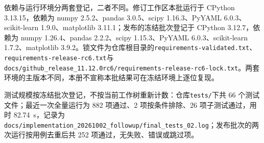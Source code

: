 \documentclass[12pt,a4paper]{article}
\begin{document}
依赖与运行环境分两套登记，二者不同。修订工作区本批运行于 CPython 3.13.15，依赖为 numpy 2.5.2、pandas 3.0.5、scipy 1.16.3、PyYAML 6.0.3、scikit-learn 1.9.0、matplotlib 3.11.1；发布的冻结批次登记于 CPython 3.12.7，依赖为 numpy 1.26.4、pandas 2.2.2、scipy 1.15.3、PyYAML 6.0.3、scikit-learn 1.7.2、matplotlib 3.9.2。锁文件为仓库根目录的\texttt{requirements-validated.txt}、\texttt{requirements-release-rc6.txt}与\texttt{docs/github\_release\_11.12.0rc6/requirements-release-rc6-lock.txt}。两套环境的主版本不同，本册不宣称本批结果可在冻结环境上逐位复现。

测试规模按冻结批次登记，不按当前工作树重新计数：仓库\texttt{tests/}下共 66 个测试文件；最近一次全量运行为 882 项通过、2 项按条件排除、26 项子测试通过，用时 82.74~s，记录为\texttt{docs/implementation\_20261002\_followup/final\_tests\_02.log}；发布批次的两次运行按用例去重后共 252 项通过，无失败、错误或跳过项。
\end{document}
